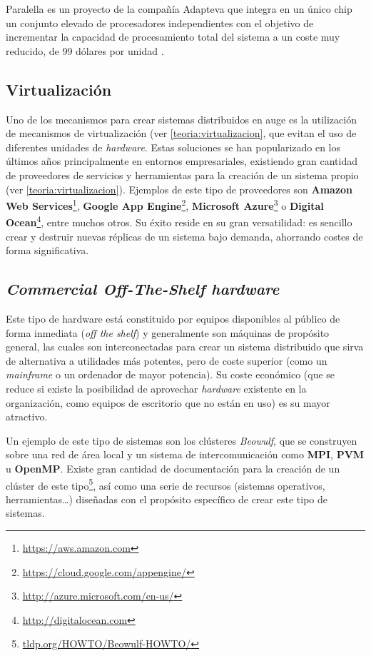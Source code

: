 Paralella es un proyecto de la compañía Adapteva que integra en un único chip un conjunto elevado de procesadores independientes con el objetivo de incrementar la capacidad de procesamiento total del sistema a un coste muy reducido, de 99 dólares por unidad \cite{paralella}.

\subsection{Virtualización}

Uno de los mecanismos para crear sistemas distribuidos en auge es la utilización de mecanismos de virtualización (ver \ref{teoria:virtualizacion}, que evitan el uso de diferentes unidades de \textit{hardware}. Estas soluciones se han popularizado en los últimos años principalmente en entornos empresariales, existiendo gran cantidad de proveedores de servicios y herramientas para la creación de un sistema propio (ver \ref{teoria:virtualizacion}). Ejemplos de este tipo de proveedores son \textbf{Amazon Web Services}\footnote{\href{http://aws.amazon.com/}{https://aws.amazon.com}}, \textbf{Google App Engine}\footnote{\href{https://cloud.google.com/appengine/}{https://cloud.google.com/appengine/}}, \textbf{Microsoft Azure}\footnote{\href{http://azure.microsoft.com/}{http://azure.microsoft.com/en-us/}} o \textbf{Digital Ocean}\footnote{\href{http://digitalocean.com}{http://digitalocean.com}}, entre muchos otros. Su éxito reside en su gran versatilidad: es sencillo crear y destruir nuevas réplicas de un sistema bajo demanda, ahorrando costes de forma significativa.

\subsection{\textit{Commercial Off-The-Shelf hardware}}

Este tipo de hardware está constituido por equipos disponibles al público de forma inmediata (\textit{off the shelf}) y generalmente son máquinas de propósito general, las cuales son interconectadas para crear un sistema distribuido que sirva de alternativa a utilidades más potentes, pero de coste superior (como un \textit{mainframe} o un ordenador de mayor potencia). Su coste económico (que se reduce si existe la posibilidad de aprovechar \textit{hardware} existente en la organización, como equipos de escritorio que no están en uso) es su mayor atractivo.

Un ejemplo de este tipo de sistemas son los clústeres \textit{Beowulf}\cite{beowulf:icpp95}, que se construyen sobre una red de área local y un sistema de intercomunicación como \textbf{MPI}, \textbf{PVM} u \textbf{OpenMP}. Existe gran cantidad de documentación para la creación de un clúster de este tipo\footnote{\href{http://tldp.org/HOWTO/Beowulf-HOWTO/}{tldp.org/HOWTO/Beowulf-HOWTO/}}, así como una serie de recursos (sistemas operativos, herramientas\dots) diseñadas con el propósito específico de crear este tipo de sistemas.


